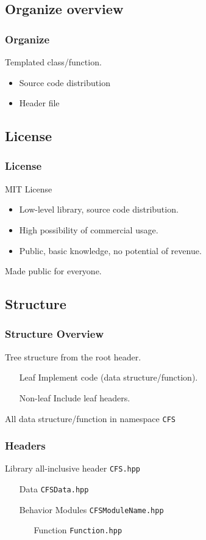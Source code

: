 \documentclass[12pt]{beamer}
\newcommand{\li}[1]{\texttt{#1}}
\begin{document}
	\subsection{Organize overview}
	\begin{frame}
		\frametitle{Organize}
		Templated class/function.
		\begin{itemize}
			\item Source code distribution
			\item Header file
		\end{itemize}
	\end{frame}

	\subsection{License}
	\begin{frame}
		\frametitle{License}
		MIT License
		\begin{itemize}
			\item Low-level library, source code distribution.
			\item High possibility of commercial usage.
			\item Public, basic knowledge, no potential of revenue.
		\end{itemize}
		Made public for everyone.
	\end{frame}
	
	\subsection{Structure}
	\begin{frame}
		\frametitle{Structure Overview}
		Tree structure from the root header.
		\begin{itemize}
			\item[Leaf] Implement code (data structure/function).
			\item[Non-leaf] Include leaf headers.
		\end{itemize}
		All data structure/function in namespace \li{CFS}
	\end{frame}

	\begin{frame}
		\frametitle{Headers}
		Library all-inclusive header \li{CFS.hpp}
		\begin{itemize}
			\item[Data] \li{CFSData.hpp}
			\item[Behavior Modules]\li{CFSModuleName.hpp}
			\begin{itemize}
				\item[Function] \li{Function.hpp}
			\end{itemize}
		\end{itemize}
	\end{frame}
\end{document}
